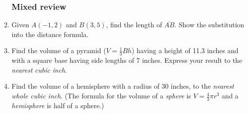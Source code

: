 \begin{enumerate}
\newpage
\subsubsection*{Mixed review}
\item Given $A(-1,2)$ and $B(3,5)$, find the length of $\overline{AB}$. Show the substitution into the distance formula.

\item Find the volume of a pyramid ($V=\frac{1}{3}Bh$) having a height of 11.3 inches and with a square base having side lengths of 7 inches. Express your result to the \emph{nearest cubic inch}. \vspace{5cm}

\item Find the volume of a hemisphere with a radius of 30 inches, to the \emph{nearest whole cubic inch}. (The formula for the volume of a \emph{sphere} is $V=\frac{4}{3}\pi r^3$ and a \emph{hemisphere} is half of a sphere.) \vspace{5cm}

\end{enumerate}

